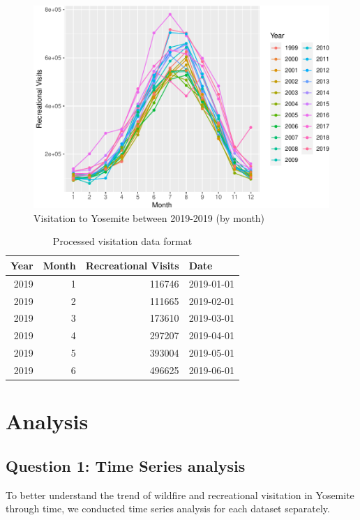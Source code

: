 \documentclass[
  12pt,
]{article}
\begin{document}
\begin{figure}

{\centering \includegraphics[width=0.6\linewidth]{CodeFinal_files/figure-latex/VisitDataExp2-1} 

}

\caption{Visitation to Yosemite between 2019-2019 (by month)}\label{fig:VisitDataExp2}
\end{figure}
\newpage
\begin{table}

\caption{\label{tab:Processed}Processed visitation data format}
\centering
\begin{tabular}[t]{r|r|r|l}
\hline
Year & Month & Recreational Visits & Date\\
\hline
2019 & 1 & 116746 & 2019-01-01\\
\hline
2019 & 2 & 111665 & 2019-02-01\\
\hline
2019 & 3 & 173610 & 2019-03-01\\
\hline
2019 & 4 & 297207 & 2019-04-01\\
\hline
2019 & 5 & 393004 & 2019-05-01\\
\hline
2019 & 6 & 496625 & 2019-06-01\\
\hline
\end{tabular}
\end{table}

\newpage

\hypertarget{analysis}{%
\section{Analysis}\label{analysis}}

\hypertarget{question-1-time-series-analysis}{%
\subsection{Question 1: Time Series analysis}\label{question-1-time-series-analysis}}

To better understand the trend of wildfire and recreational visitation in Yosemite through time, we conducted time series analysis for each dataset separately.
\end{document}
